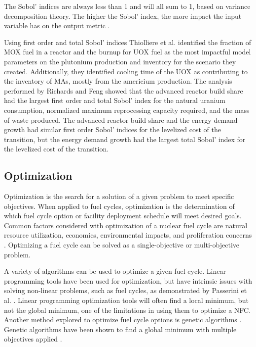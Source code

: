 \noindent The Sobol' indices are always less than 1 and will all sum to 1, 
based
on variance decomposition theory. The higher the Sobol' index, the more 
impact the input variable has on the output metric 
\cite{thiolliere_methodology_2018}.

Using first order and total Sobol' indices Thiolliere et al.
\cite{thiolliere_methodology_2018} identified 
the fraction of \gls{MOX} fuel in a reactor 
and the burnup for \gls{UOX} fuel as the most impactful model parameters on 
the plutonium production and inventory
for the scenario they created. 
Additionally, they identified cooling time of the \gls{UOX} as contributing 
to the inventory of \glspl{MA}, mostly from the 
americium production. The analysis performed by Richards and Feng
\cite{richards_application_2021}
showed that the advanced reactor build share had the largest first 
order and total Sobol' index for the natural uranium consumption, 
normalized 
maximum reprocessing capacity required, and the mass of waste produced. The 
advanced reactor build share and the energy demand growth had similar first 
order Sobol' indices for the levelized cost of the transition, but the 
energy demand growth had the largest total Sobol' index for the levelized 
cost of the transition. 

\subsection{Optimization}
Optimization is the search for a solution of a given problem to 
meet specific objectives. When applied to fuel cycles, optimization 
is the determination of which fuel cycle option or facility 
deployment schedule will meet desired goals. Common factors 
considered with optimization of a nuclear fuel cycle are natural 
resource utilization, economics, environmental impacts, and proliferation 
concerns \cite{passerini_systematic_2014,wigeland_nuclear_2014}. Optimizing 
a fuel cycle can be solved as a single-objective or multi-objective 
problem. 

A variety of algorithms can be used to optimize a given 
fuel cycle. Linear programming tools have been used for 
optimization, but have intrinsic issues with solving non-linear 
problems, such as fuel cycles, as demonstrated by 
Passerini et al. \cite{passerini_systematic_2014}.
Linear programming optimization tools will often find a local minimum, 
but not the global minimum, one of the limitations in using them 
to optimize a \gls{NFC}.
Another method explored to optimize fuel cycle options is genetic 
algorithms \cite{passerini_systematic_2014}. Genetic algorithms 
have been shown to find a global minimum with multiple objectives 
applied \cite{passerini_systematic_2014}. 

